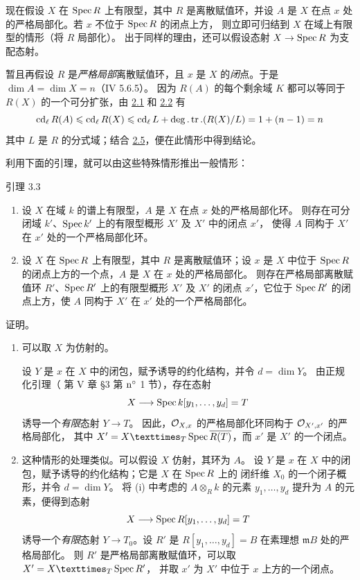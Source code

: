 现在假设 $X$ 在 $\operatorname{Spec} R$ 上有限型，其中 $R$ 是离散赋值环，并设 $A$ 是
$X$ 在点 $x$ 处的严格局部化。若 $x$ 不位于 $\operatorname{Spec} R$ 的闭点上方，
则立即可归结到 $X$ 在域上有限型的情形（将 $R$ 局部化）。
出于同样的理由，还可以假设态射 $X\rightarrow \operatorname{Spec} R$ 为支配态射。

暂且\pageoriginale 再假设 $R$ 是\emph{严格局部}离散赋值环，且 $x$ 是
$X$ 的\emph{闭}点。于是 $\dim A=\dim X=n$（\EGA IV 5.6.5）。
因为 $R(A)$ 的每个剩余域 $K$ 都可以等同于 $R(X)$ 的一个可分扩张，由
\hyperref[X.thm2.1]{2.1} 和 \hyperref[X.thm2.2]{2.2} 有
$$
\operatorname{cd}_{\ell}R(A)\leqslant \operatorname{cd}_{\ell}R(X)\leqslant
\operatorname{cd}_{\ell}L+\deg.\operatorname{tr}.(R(X)/L)=1+(n-1)=n
$$
其中 $L$ 是 $R$ 的分式域；结合 \hyperref[X.cor2.5]{2.5}，便在此情形中得到结论。

利用下面的引理，就可以由这些特殊情形推出一般情形：

\begin{enonce*}{引理 3.3}
\begin{enumerate}
\renewcommand{\theenumi}{\roman{enumi}}
\renewcommand{\labelenumi}{(\theenumi)}
\item 设 $X$ 在域 $k$ 的谱上有限型，$A$ 是 $X$ 在点 $x$ 处的严格局部化环。
  则存在可分闭域 $k'$、$\operatorname{Spec} k'$ 上的有限型概形 $X'$ 及 $X'$ 中的闭点 $x'$，
  使得 $A$ 同构于 $X'$ 在 $x'$ 处的一个严格局部化环。

\item 设 $X$ 在 $\operatorname{Spec} R$ 上有限型，其中 $R$ 是离散赋值环；设 $x$ 是
  $X$ 中位于 $\operatorname{Spec} R$ 的闭点上方的一个点，$A$ 是 $X$ 在 $x$ 处的严格局部化。
  则存在严格局部离散赋值环 $R'$、$\operatorname{Spec} R'$ 上的有限型概形 $X'$ 及 $X'$ 的闭点
  $x'$，它位于 $\operatorname{Spec} R'$ 的闭点上方，使 $A$ 同构于 $X'$ 在 $x'$ 处的一个严格局部化。
\end{enumerate}
\end{enonce*}

证明。
\begin{enumerate}
\renewcommand{\theenumi}{\roman{enumi}}
\renewcommand{\labelenumi}{(\theenumi)}
\item 可以取 $X$ 为仿射的。

设 $Y$ 是 $x$ 在 $X$ 中的闭包，赋予诱导的约化结构，并令 $d=\dim Y$。
由正规化引理（\cite{sga4.exp.X.bib.2} 第 V 章 \S 3 第 ${\rm n^{\circ}}$ 1 节），存在态射
$$
X\longrightarrow \operatorname{Spec} k[y_1,\dots, y_d]=T
$$
诱导\pageoriginale 一个\emph{有限}态射 $Y\rightarrow T$。
因此，${\mathcal O}_{X,x}$ 的严格局部化环同构于 ${\mathcal O}_{X',x'}$ 的严格局部化，
其中 $X'=\fprod{X}{\Spec\bar{R(T)}}{T}$，而 $x'$ 是 $X'$ 的一个闭点。

\item 这种情形的处理类似。可以假设 $X$ 仿射，其环为 $A$。
设 $Y$ 是 $x$ 在 $X$ 中的闭包，赋予诱导的约化结构；它是 $X$ 在 $\operatorname{Spec} R$ 上的
闭纤维 $X_0$ 的一个闭子概形，并令 $d=\dim Y$。
将 (i) 中考虑的 $A\otimes_R k$ 的元素 $y_1,\ldots,y_d$ 提升为 $A$ 的元素，便得到态射
$$
X\longrightarrow \operatorname{Spec} R[y_1,\dots,y_d]=T
$$
诱导一个\emph{有限}态射 $Y\rightarrow T_0$。设 $R'$ 是
$R[y_1,\ldots,y_d]=B$ 在素理想 $𝔪B$ 处的严格局部化。
则 $R'$ 是严格局部离散赋值环，可以取 $X'=\fprod{X}{\Spec R'}{T}$，
并取 $x'$ 为 $X'$ 中位于 $x$ 上方的一个闭点。
\end{enumerate}


